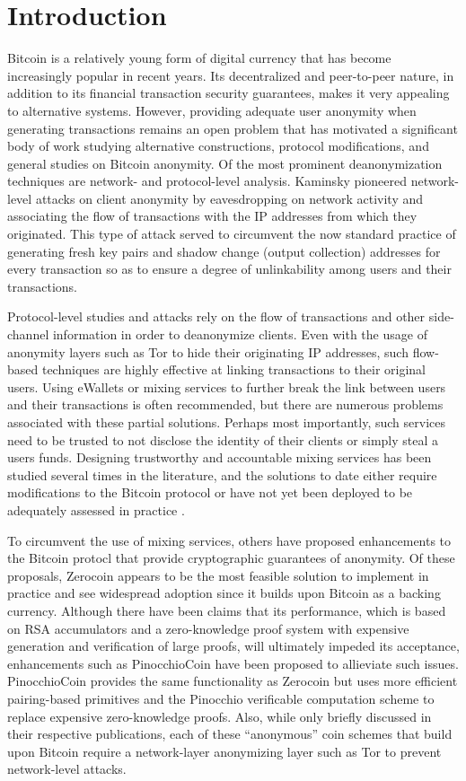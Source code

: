 \section{Introduction}
Bitcoin is a relatively young form of digital currency that has become increasingly popular in recent years. Its decentralized and peer-to-peer nature, in addition to its financial transaction security guarantees, makes it very appealing to alternative systems. However, providing adequate user anonymity when generating transactions remains an open problem that has motivated a significant body of work studying alternative constructions, protocol modifications, and general studies on Bitcoin anonymity. Of the most prominent deanonymization techniques are network- and protocol-level analysis. Kaminsky \cite{kaminsky} pioneered network-level attacks on client anonymity by eavesdropping on network activity and associating the flow of transactions with the IP addresses from which they originated. This type of attack served to circumvent the now standard practice of generating fresh key pairs and shadow change (output collection) addresses for every transaction so as to ensure a degree of unlinkability among users and their transactions. 

Protocol-level studies and attacks rely on the flow of transactions and other side-channel information in order to deanonymize clients. Even with the usage of anonymity layers such as Tor to hide their originating IP addresses, such flow-based techniques are highly effective at linking transactions to their original users. Using eWallets or mixing services to further break the link between users and their transactions is often recommended, but there are numerous problems associated with these partial solutions. Perhaps most importantly, such services need to be trusted to not disclose the identity of their clients or simply steal a users funds. Designing trustworthy and accountable mixing services has been studied several times in the literature, and the solutions to date either require modifications to the Bitcoin protocol \cite{BitterToBetter} or have not yet been deployed to be adequately assessed in practice \cite{mixcoin}.

To circumvent the use of mixing services, others have proposed enhancements to the Bitcoin protocl that provide cryptographic guarantees of anonymity. Of these proposals, Zerocoin \cite{zerocoin} appears to be the most feasible solution to implement in practice and see widespread adoption since it builds upon Bitcoin as a backing currency. Although there have been claims that its performance, which is based on RSA accumulators and a zero-knowledge proof system with expensive generation and verification of large proofs, will ultimately impeded its acceptance, enhancements such as PinocchioCoin \cite{pinocchio} have been proposed to allieviate such issues. PinocchioCoin provides the same functionality as Zerocoin but uses more efficient pairing-based primitives and the Pinocchio verificable computation scheme to replace expensive zero-knowledge proofs. Also, while only briefly discussed in their respective publications, each of these ``anonymous'' coin schemes that build upon Bitcoin require a network-layer anonymizing layer such as Tor to prevent network-level attacks.

